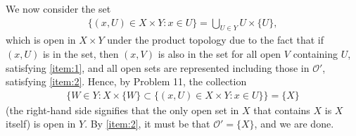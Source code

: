 \documentclass[a4paper,12pt]{article}
\begin{document}
\begin{enumerate}
\begin{itemize}
        \end{itemize}
        We now consider the set
        \begin{align*}
            \{ (x, U) \in X \times Y : x \in U \} = \bigcup_{U \in Y} U \times \{U\},
        \end{align*}
        which is open in $X \times Y$ under the product topology due to the fact that if $(x, U)$ is in the set, then $(x, V)$ is also in the set for all open $V$ containing $U$, satisfying \ref{item:1}, and all open sets are represented including those in $\mathcal{O}'$, satisfying \ref{item:2}. Hence, by Problem 11, the collection
        \begin{align*}
            \{ W \in Y : X \times \{W\} \subset \{ (x, U) \in X \times Y : x \in U \} \} = \{X\}
        \end{align*}
        (the right-hand side signifies that the only open set in $X$ that contains $X$ is $X$ itself) is open in $Y$. By \ref{item:2}, it must be that $\mathcal{O}' = \{X\}$, and we are done.
\end{enumerate}
\end{document}
